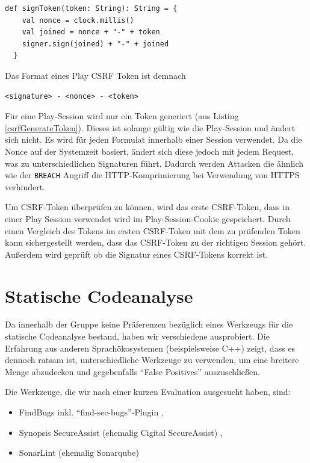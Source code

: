 \documentclass[12pt,DIV14,BCOR10mm,a4paper,parskip=half-,headsepline,headinclude,english,ngerman,bibliography=totocnumbered]{scrreprt}
\begin{document}
\begin{lstlisting}[label=csrfSignToken, caption={Methode zum Signieren von Token. Aus DefaultCSRFTokenSigner, Play 2.6.20},captionpos=b]
  def signToken(token: String): String = {
    val nonce = clock.millis()
    val joined = nonce + "-" + token
    signer.sign(joined) + "-" + joined
  }
\end{lstlisting}

Das Format eines Play CSRF Token ist demnach
\begin{lstlisting}
<signature> - <nonce> - <token>
\end{lstlisting}

Für eine Play-Session wird nur ein Token generiert (aus Listing \ref{csrfGenerateToken}). Dieses ist solange gültig wie die Play-Session und ändert sich nicht. Es wird für jeden Formulat innerhalb einer Session verwendet. Da die Nonce auf der Systemzeit basiert, ändert sich diese jedoch mit jedem Request, was zu unterschiedlichen Signaturen führt. Dadurch werden Attacken die ähnlich wie der \texttt{BREACH} Angriff die HTTP-Komprimierung bei Verwendung von HTTPS verhindert.

Um CSRF-Token überprüfen zu können, wird das erste CSRF-Token, dass in einer Play Session verwendet wird im Play-Session-Cookie gespeichert. Durch einen Vergleich des Tokens im ersten CSRF-Token mit dem zu prüfenden Token kann sichergestellt werden, dass das CSRF-Token zu der richtigen Session gehört. Außerdem wird geprüft ob die Signatur eines CSRF-Tokens korrekt ist.


\section{Statische Codeanalyse}

Da innerhalb der Gruppe keine Präferenzen bezüglich eines Werkzeugs für die statische Codeanalyse bestand, haben wir verschiedene ausprobiert.
Die Erfahrung aus anderen Sprachökosystemen (beispielsweise C++) zeigt, dass es dennoch ratsam ist, unterschiedliche Werkzeuge zu verwenden, um eine breitere Menge abzudecken und gegebenfalls \enquote{False Positives} auszuschließen.

Die Werkzeuge, die wir nach einer kurzen Evaluation ausgesucht haben, sind:

\begin{itemize}
  \item FindBugs \autocite{FindBugs} inkl. \enquote{find-sec-bugs}-Plugin \autocite{FindBugs.FindSecBugs},
  \item Synopsis SecureAssist (ehemalig Cigital SecureAssist) \autocite{SecureAssist},
  \item SonarLint (ehemalig Sonarqube) \autocite{SonarLint}
\end{itemize}
\end{document}
